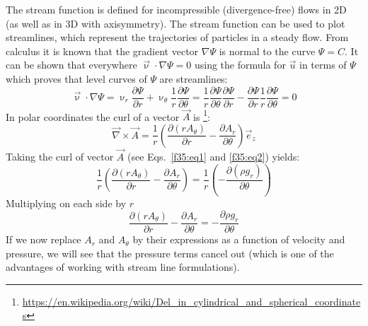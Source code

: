 The stream function is defined for incompressible (divergence-free) 
flows in 2D (as well as in 3D with axisymmetry).
The stream function can be used to plot streamlines, 
which represent the trajectories of particles in a steady flow.
From calculus it is known that the gradient vector $\nabla \Psi$
is normal to the curve $\Psi =C$. 
It can be shown that everywhere ${\vec{\upnu}}\cdot \nabla \Psi =0$ 
using the formula for $\vec{u}$ in terms of 
$\Psi$ which proves that level curves of $\Psi$ are streamlines:
\[
{\vec \upnu}\cdot \nabla \Psi 
= \upnu_r \frac{\partial \Psi}{\partial r} + \upnu_\theta \frac{1}{r} \frac{\partial \Psi}{\partial \theta} 
= \frac{1}{r}\frac{\partial \Psi}{\partial \theta} \frac{\partial \Psi}{\partial r} 
- \frac{\partial \Psi}{\partial r} \frac{1}{r} \frac{\partial \Psi}{\partial \theta} 
=0
\] 
In polar coordinates the curl of a vector ${\vec A}$ is
\footnote{\url{https://en.wikipedia.org/wiki/Del_in_cylindrical_and_spherical_coordinates}}:
\[
{\vec \nabla}\times {\vec A}
=
\frac{1}{r}\left(  
\frac{\partial (r A_\theta)}{\partial r}
-
\frac{\partial A_r}{\partial \theta}
\right) \vec{e}_z
\]
Taking the curl of vector ${\vec A}$ (see Eqs.~\eqref{f35:eq1} and \eqref{f35:eq2}) yields:
\[
\frac{1}{r}\left(  
\frac{\partial (r A_\theta)}{\partial r}
- \frac{\partial A_r}{\partial \theta}
\right)
=
\frac{1}{r}\left(  
- \frac{\partial (\rho g_r)}{\partial \theta}
\right)
\]
Multiplying on each side by $r$ 
\[
\frac{\partial (r A_\theta)}{\partial r}
- \frac{\partial A_r}{\partial \theta}
=
- \frac{\partial \rho g_r}{\partial \theta}
\]
If we now replace $A_r$ and $A_\theta$ by their expressions as a function of velocity and pressure, 
we will see that the pressure terms cancel out (which is one of the advantages of working with stream line formulations).


